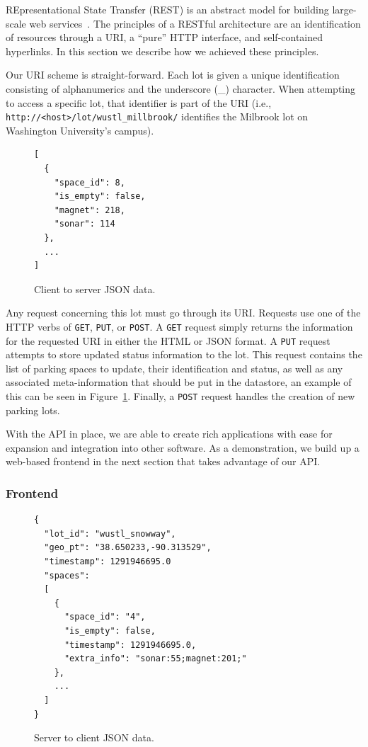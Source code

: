 \documentclass{acm_proc}
\begin{document}
REpresentational State Transfer (REST) is an abstract model for building
large-scale web services~\cite{pautasso:restful}.
The principles of a RESTful architecture are an identification of resources
through a URI, a ``pure'' HTTP interface, and self-contained hyperlinks.
In this section we describe how we achieved these principles.

Our URI scheme is straight-forward.
Each lot is given a unique identification consisting of alphanumerics and
the underscore (\_) character.
When attempting to access a specific lot, that identifier is part of the
URI (i.e.,
\texttt{http://<host>/lot/wustl\_millbrook/}
identifies the Milbrook lot on Washington University's campus).

\begin{figure}
    \begin{verbatim}
[
  {
    "space_id": 8,
    "is_empty": false,
    "magnet": 218,
    "sonar": 114
  },
  ...
]
\end{verbatim}
	\caption{Client to server JSON data.}
	\label{fig:clientserverjson}
\end{figure}

Any request concerning this lot must go through its URI.
Requests use one of the HTTP verbs of \texttt{GET}, \texttt{PUT}, or
\texttt{POST}.
A \texttt{GET} request simply returns the information for the requested URI
in either the HTML or JSON format.
A \texttt{PUT} request attempts to store updated status information to the
lot.
This request contains the list of parking spaces to update, their
identification and status, as well as any associated meta-information that
should be put in the datastore, an example of this can be seen in
Figure~\ref{fig:clientserverjson}.
Finally, a \texttt{POST} request handles the creation of new parking lots.

With the API in place, we are able to create rich applications with ease
for expansion and integration into other software.
As a demonstration, we build up a web-based frontend in the next section
that takes advantage of our API.

\subsubsection{Frontend}

\begin{figure}
    \begin{verbatim}
{
  "lot_id": "wustl_snowway",
  "geo_pt": "38.650233,-90.313529",
  "timestamp": 1291946695.0
  "spaces":
  [
    {
      "space_id": "4",
      "is_empty": false,
      "timestamp": 1291946695.0,
      "extra_info": "sonar:55;magnet:201;"
    },
    ...
  ]
}
\end{verbatim}
	\caption{Server to client JSON data.}
	\label{fig:serverclientjson}
\end{figure}
\end{document}
